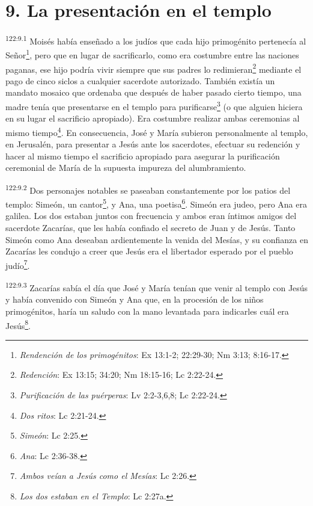 \section*{9. La presentación en el templo}
\par 
\textsuperscript{122:9.1} Moisés había enseñado a los judíos que cada hijo primogénito pertenecía al Señor\footnote{\textit{Rendención de los primogénitos}: Ex 13:1-2; 22:29-30; Nm 3:13; 8:16-17.}, pero que en lugar de sacrificarlo, como era costumbre entre las naciones paganas, ese hijo podría vivir siempre que sus padres lo redimieran\footnote{\textit{Redención}: Ex 13:15; 34:20; Nm 18:15-16; Lc 2:22-24.} mediante el pago de cinco siclos a cualquier sacerdote autorizado. También existía un mandato mosaico que ordenaba que después de haber pasado cierto tiempo, una madre tenía que presentarse en el templo para purificarse\footnote{\textit{Purificación de las puérperas}: Lv 2:2-3,6,8; Lc 2:22-24.} (o que alguien hiciera en su lugar el sacrificio apropiado). Era costumbre realizar ambas ceremonias al mismo tiempo\footnote{\textit{Dos ritos}: Lc 2:21-24.}. En consecuencia, José y María subieron personalmente al templo, en Jerusalén, para presentar a Jesús ante los sacerdotes, efectuar su redención y hacer al mismo tiempo el sacrificio apropiado para asegurar la purificación ceremonial de María de la supuesta impureza del alumbramiento.

\par 
\textsuperscript{122:9.2} Dos personajes notables se paseaban constantemente por los patios del templo: Simeón, un cantor\footnote{\textit{Simeón}: Lc 2:25.}, y Ana, una poetisa\footnote{\textit{Ana}: Lc 2:36-38.}. Simeón era judeo, pero Ana era galilea. Los dos estaban juntos con frecuencia y ambos eran íntimos amigos del sacerdote Zacarías, que les había confiado el secreto de Juan y de Jesús. Tanto Simeón como Ana deseaban ardientemente la venida del Mesías, y su confianza en Zacarías les condujo a creer que Jesús era el libertador esperado por el pueblo judío\footnote{\textit{Ambos veían a Jesús como el Mesías}: Lc 2:26.}.

\par 
\textsuperscript{122:9.3} Zacarías sabía el día que José y María tenían que venir al templo con Jesús y había convenido con Simeón y Ana que, en la procesión de los niños primogénitos, haría un saludo con la mano levantada para indicarles cuál era Jesús\footnote{\textit{Los dos estaban en el Templo}: Lc 2:27a.}.

